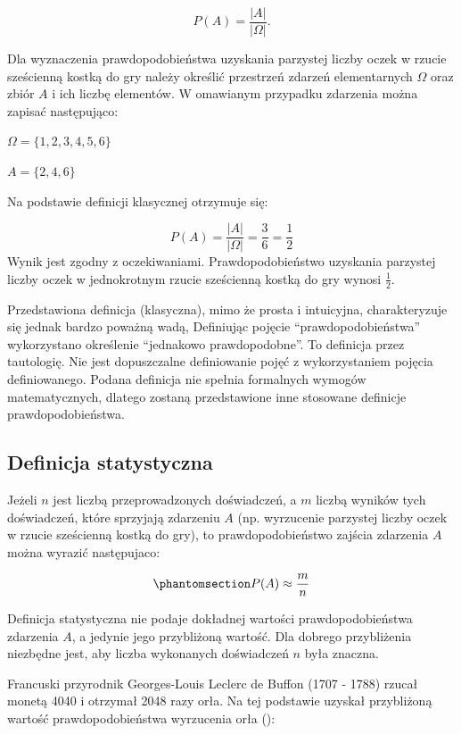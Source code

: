 \documentclass[
  letterpaper,
  DIV=11,
  numbers=noendperiod]{scrreprt}
\begin{document}
\[ P(A) = \frac{|A|}{|\Omega|}.\]

Dla wyznaczenia prawdopodobieństwa uzyskania parzystej liczby oczek w
rzucie sześcienną kostką do gry należy określić przestrzeń zdarzeń
elementarnych \(\Omega\) oraz zbiór \(A\) i ich liczbę elementów. W
omawianym przypadku zdarzenia można zapisać następująco:

\(\Omega = \{{1,2,3,4,5,6}\}\)

\(A=\{{2,4,6}\}\)

Na podstawie definicji klasycznej otrzymuje się:

\[ P(A) = \frac{|A|}{|\Omega|}=\frac{3}{6}=\frac{1}{2}\] Wynik jest
zgodny z oczekiwaniami. Prawdopodobieństwo uzyskania parzystej liczby
oczek w jednokrotnym rzucie sześcienną kostką do gry wynosi
\(\frac{1}{2}\).

Przedstawiona definicja (klasyczna), mimo że prosta i intuicyjna,
charakteryzuje się jednak bardzo poważną wadą, Definiując pojęcie
``prawdopodobieństwa'' wykorzystano określenie ``jednakowo
prawdopodobne''. To definicja przez tautologię. Nie jest dopuszczalne
definiowanie pojęć z wykorzystaniem pojęcia definiowanego. Podana
definicja nie spełnia formalnych wymogów matematycznych, dlatego zostaną
przedstawione inne stosowane definicje prawdopodobieństwa.

\subsection{Definicja statystyczna}\label{definicja-statystyczna}

Jeżeli \(n\) jest liczbą przeprowadzonych doświadczeń, a \(m\) liczbą
wyników tych doświadczeń, które sprzyjają zdarzeniu \(A\) (np.
wyrzucenie parzystej liczby oczek w rzucie sześcienną kostką do gry), to
prawdopodobieństwo zajścia zdarzenia \(A\) można wyrazić następujaco:

\begin{equation}\phantomsection\label{eq-pr_stat}{ P(A) \approx \frac{m}{n}}\end{equation}

Definicja statystyczna nie podaje dokładnej wartości prawdopodobieństwa
zdarzenia \(A\), a jedynie jego przybliżoną wartość. Dla dobrego
przybliżenia niezbędne jest, aby liczba wykonanych doświadczeń \(n\)
była znaczna.

Francuski przyrodnik Georges-Louis Leclerc de Buffon (1707 - 1788)
rzucał monetą 4040 i otrzymał 2048 razy orła. Na tej podstawie uzyskał
przybliżoną wartość prawdopodobieństwa wyrzucenia orła
():
\end{document}

